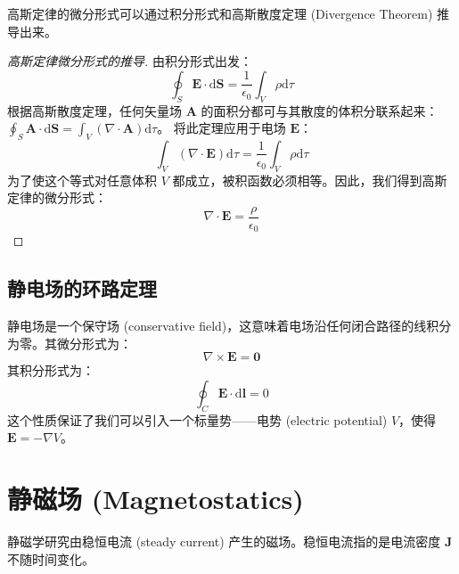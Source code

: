 \documentclass[fontset=none]{ctexart}
\begin{document}
高斯定律的微分形式可以通过积分形式和高斯散度定理 (Divergence Theorem) 推导出来。
\begin{proof}[高斯定律微分形式的推导]
    由积分形式出发：
    \begin{equation}
        \oint_S \bm{E} \cdot \mathrm{d}\bm{S} = \frac{1}{\epsilon_0} \int_V \rho \mathrm{d}\tau
    \end{equation}
    根据高斯散度定理，任何矢量场 $\bm{A}$ 的面积分都可与其散度的体积分联系起来： $\oint_S \bm{A} \cdot \mathrm{d}\bm{S} = \int_V (\nabla \cdot \bm{A}) \mathrm{d}\tau$。
    将此定理应用于电场 $\bm{E}$：
    \begin{equation}
        \int_V (\nabla \cdot \bm{E}) \mathrm{d}\tau = \frac{1}{\epsilon_0} \int_V \rho \mathrm{d}\tau
    \end{equation}
    为了使这个等式对任意体积 $V$ 都成立，被积函数必须相等。因此，我们得到高斯定律的微分形式：
    \begin{equation}
        \nabla \cdot \bm{E} = \frac{\rho}{\epsilon_0}
    \end{equation}
\end{proof}
\subsection{静电场的环路定理}
\begin{proposition}[静电场无旋性]
    静电场是一个保守场 (conservative field)，这意味着电场沿任何闭合路径的线积分为零。其微分形式为：
    \begin{equation}
        \nabla \times \bm{E} = \bm{0}
    \end{equation}
    其积分形式为：
    \begin{equation}
        \oint_C \bm{E} \cdot \mathrm{d}\bm{l} = 0
    \end{equation}
    这个性质保证了我们可以引入一个标量势——电势 (electric potential) $V$，使得 $\bm{E} = -\nabla V$。
\end{proposition}

\section{静磁场 (Magnetostatics)}
静磁学研究由稳恒电流 (steady current) 产生的磁场。稳恒电流指的是电流密度 $\bm{J}$ 不随时间变化。
\end{document}
